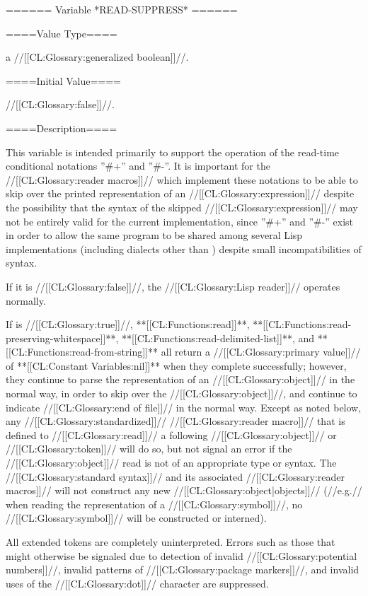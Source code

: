 ====== Variable *READ-SUPPRESS* ======

====Value Type====

a //[[CL:Glossary:generalized boolean]]//.

====Initial Value====

//[[CL:Glossary:false]]//.

====Description====

This variable is intended primarily to support the operation of the read-time conditional notations ''#+'' and ''#-''. It is important for the //[[CL:Glossary:reader macros]]// which implement these notations to be able to skip over the printed representation of an //[[CL:Glossary:expression]]// despite the possibility that the syntax of the skipped //[[CL:Glossary:expression]]// may not be entirely valid for the current implementation, since ''#+'' and ''#-'' exist in order to allow the same program to be shared among several Lisp implementations (including dialects other than \clisp) despite small incompatibilities of syntax.

If it is //[[CL:Glossary:false]]//, the //[[CL:Glossary:Lisp reader]]// operates normally.

If  is //[[CL:Glossary:true]]//, **[[CL:Functions:read]]**, **[[CL:Functions:read-preserving-whitespace]]**, **[[CL:Functions:read-delimited-list]]**, and **[[CL:Functions:read-from-string]]** all return a //[[CL:Glossary:primary value]]// of **[[CL:Constant Variables:nil]]** when they complete successfully; however, they continue to parse the representation of an //[[CL:Glossary:object]]// in the normal way, in order to skip over the //[[CL:Glossary:object]]//, and continue to indicate //[[CL:Glossary:end of file]]// in the normal way. Except as noted below, any //[[CL:Glossary:standardized]]// //[[CL:Glossary:reader macro]]// that is defined to //[[CL:Glossary:read]]// a following //[[CL:Glossary:object]]// or //[[CL:Glossary:token]]// will do so, but not signal an error if the //[[CL:Glossary:object]]// read is not of an appropriate type or syntax. The //[[CL:Glossary:standard syntax]]// and its associated //[[CL:Glossary:reader macros]]// will not construct any new //[[CL:Glossary:object|objects]]// (//e.g.// when reading the representation of a //[[CL:Glossary:symbol]]//, no //[[CL:Glossary:symbol]]// will be constructed or interned).

\beginlist


All extended tokens are completely uninterpreted. Errors such as those that might otherwise be signaled due to detection of invalid //[[CL:Glossary:potential numbers]]//, invalid patterns of //[[CL:Glossary:package markers]]//, and invalid uses of the //[[CL:Glossary:dot]]// character are suppressed.

